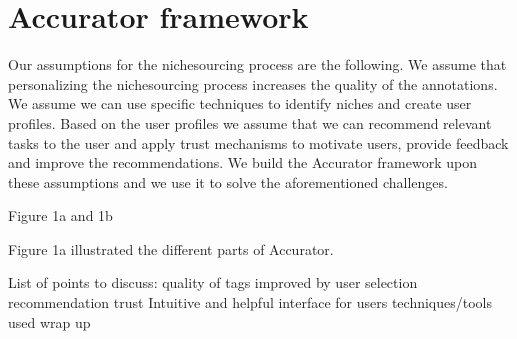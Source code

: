 \section{Accurator framework}
\label{architecture}
Our assumptions for the nichesourcing process are the following. 
We assume that personalizing the nichesourcing process increases the quality of the annotations. 
We assume we can use specific techniques to identify niches and create user profiles. 
Based on the user profiles we assume that we can recommend relevant tasks to the user and apply trust mechanisms to motivate users, provide feedback and improve the recommendations.  
We build the Accurator framework upon these assumptions and we use it to solve the aforementioned challenges. 

Figure 1a and 1b

Figure 1a illustrated the different parts of Accurator. 

List of points to discuss:
quality of tags improved by
user selection
recommendation
trust
Intuitive and helpful interface for users 
techniques/tools used
wrap up


